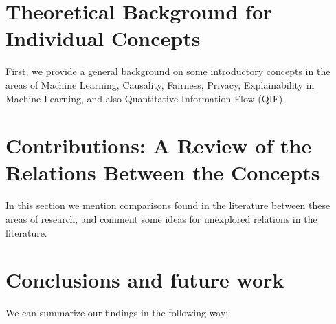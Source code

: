 \documentclass[conference]{IEEEtran}
\begin{document}
\section{Theoretical Background for Individual Concepts}\label{sec:theoRef1}

First, we provide a general background on some introductory concepts in the areas of Machine Learning, Causality, Fairness, Privacy, Explainability in Machine Learning, and also Quantitative Information Flow (QIF).



\section{Contributions: A Review of the Relations Between the Concepts}\label{sec:theoRef2}

In this section we mention comparisons found in the literature between these areas of research, and comment some ideas for unexplored relations in the literature.



\section{Conclusions and future work}\label{sec:concsFuture}

We can summarize our findings in the following way:
\end{document}
